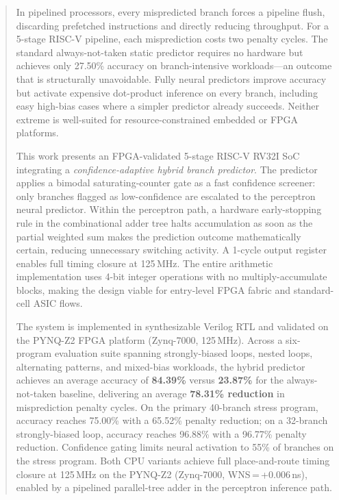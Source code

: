 \documentclass[12pt,a4paper]{article}
\begin{document}
\begin{abstract}
In pipelined processors, every mispredicted branch forces a pipeline flush,
discarding prefetched instructions and directly reducing throughput. For a
5-stage RISC-V pipeline, each misprediction costs two penalty cycles. The
standard always-not-taken static predictor requires no hardware but achieves
only 27.50\% accuracy on branch-intensive workloads---an outcome that is
structurally unavoidable. Fully neural predictors improve accuracy but activate
expensive dot-product inference on every branch, including easy high-bias cases
where a simpler predictor already succeeds. Neither extreme is well-suited for
resource-constrained embedded or FPGA platforms.

This work presents an FPGA-validated 5-stage RISC-V RV32I SoC
integrating a \emph{confidence-adaptive hybrid branch predictor}. The predictor
applies a bimodal saturating-counter gate as a fast confidence screener: only
branches flagged as low-confidence are escalated to the perceptron neural
predictor. Within the perceptron path, a hardware early-stopping rule in the combinational
adder tree halts accumulation as soon as the partial weighted sum makes the
prediction outcome mathematically certain, reducing unnecessary switching
activity. A 1-cycle output register enables full timing closure at 125\,MHz.
The entire arithmetic implementation uses 4-bit integer operations with no
multiply-accumulate blocks, making the design viable for entry-level FPGA
fabric and standard-cell ASIC flows.

The system is implemented in synthesizable Verilog RTL and validated on the
PYNQ-Z2 FPGA platform (Zynq-7000, 125\,MHz). Across a six-program evaluation
suite spanning strongly-biased loops, nested loops, alternating patterns, and
mixed-bias workloads, the hybrid predictor achieves an average accuracy of
\textbf{84.39\%} versus \textbf{23.87\%} for the always-not-taken baseline,
delivering an average \textbf{78.31\% reduction} in misprediction penalty
cycles. On the primary 40-branch stress program, accuracy reaches 75.00\%
with a 65.52\% penalty reduction; on a 32-branch strongly-biased loop, accuracy
reaches 96.88\% with a 96.77\% penalty reduction. Confidence gating limits
neural activation to 55\% of branches on the stress program. Both CPU
variants achieve full place-and-route timing closure at 125\,MHz on the
PYNQ-Z2 (Zynq-7000, WNS\,=\,+0.006\,ns), enabled by a pipelined
parallel-tree adder in the perceptron inference path.
\end{abstract}
\end{document}
